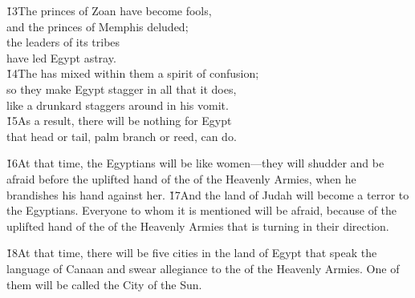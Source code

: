 \begin{poetry}
\poeml \v{13}The princes of Zoan have become fools, \\
\poemll    and the princes of Memphis deluded; \\
\poeml the leaders of its tribes \\
\poemll    have led Egypt astray. \\
\poeml \v{14}The  has mixed within them a spirit of confusion; \\
\poemll    so they make Egypt stagger in all that it does, \\
\poemlll       like a drunkard staggers around in his vomit. \\
\poeml \v{15}As a result, there will be nothing for Egypt \\
\poemll    that head or tail, palm branch or reed, can do.
\end{poetry}

\v{16}At that time, the Egyptians will be like women---they will shudder and be afraid before the uplifted hand of the  of the Heavenly Armies, when he brandishes his hand against her. \v{17}And the land of Judah will become a terror to the Egyptians. Everyone to whom it is mentioned will be afraid, because of the uplifted hand of the  of the Heavenly Armies that is turning in their direction.

\v{18}At that time, there will be five cities in the land of Egypt that speak the language of Canaan and swear allegiance to the  of the Heavenly Armies. One of them will be called the City of the Sun.

